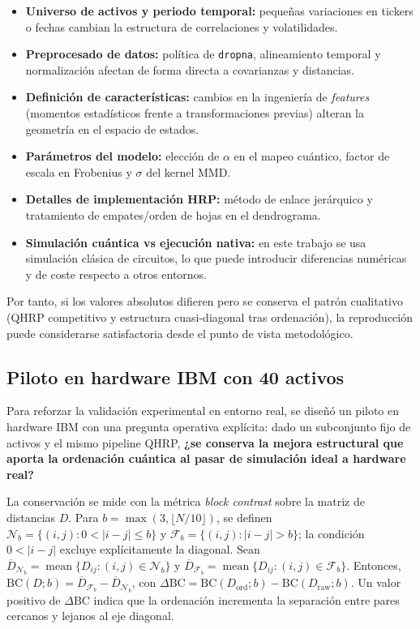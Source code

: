 \begin{itemize}
	\item \textbf{Universo de activos y periodo temporal:} pequeñas variaciones en tickers o fechas cambian la estructura de correlaciones y volatilidades.
	\item \textbf{Preprocesado de datos:} política de \texttt{dropna}, alineamiento temporal y normalización afectan de forma directa a covarianzas y distancias.
	\item \textbf{Definición de características:} cambios en la ingeniería de \textit{features} (momentos estadísticos frente a transformaciones previas) alteran la geometría en el espacio de estados.
	\item \textbf{Parámetros del modelo:} elección de $\alpha$ en el mapeo cuántico, factor de escala en Frobenius y $\sigma$ del kernel MMD.
	\item \textbf{Detalles de implementación HRP:} método de enlace jerárquico y tratamiento de empates/orden de hojas en el dendrograma.
	\item \textbf{Simulación cuántica vs ejecución nativa:} en este trabajo se usa simulación clásica de circuitos, lo que puede introducir diferencias numéricas y de coste respecto a otros entornos.
\end{itemize}

Por tanto, si los valores absolutos difieren pero se conserva el patrón cualitativo (QHRP competitivo y estructura cuasi-diagonal tras ordenación), la reproducción puede considerarse satisfactoria desde el punto de vista metodológico.

\subsection{Piloto en hardware IBM con 40 activos}
Para reforzar la validación experimental en entorno real, se diseñó un piloto en hardware IBM con una pregunta operativa explícita: dado un subconjunto fijo de activos y el mismo pipeline QHRP, \textbf{¿se conserva la mejora estructural que aporta la ordenación cuántica al pasar de simulación ideal a hardware real?}

La conservación se mide con la métrica \textit{block contrast} sobre la matriz de distancias \(D\). Para \(b=\max(3,\lfloor N/10\rfloor)\), se definen \(\mathcal{N}_b=\{(i,j):0<|i-j|\le b\}\) y \(\mathcal{F}_b=\{(i,j):|i-j|>b\}\); la condición \(0<|i-j|\) excluye explícitamente la diagonal. Sean \(\overline{D}_{\mathcal{N}_b}=\operatorname{mean}\{D_{ij}:(i,j)\in\mathcal{N}_b\}\) y \(\overline{D}_{\mathcal{F}_b}=\operatorname{mean}\{D_{ij}:(i,j)\in\mathcal{F}_b\}\). Entonces, \(\mathrm{BC}(D;b)=\overline{D}_{\mathcal{F}_b}-\overline{D}_{\mathcal{N}_b}\), con \(\Delta\mathrm{BC}=\mathrm{BC}(D_{\text{ord}};b)-\mathrm{BC}(D_{\text{raw}};b)\). Un valor positivo de \(\Delta\mathrm{BC}\) indica que la ordenación incrementa la separación entre pares cercanos y lejanos al eje diagonal.

